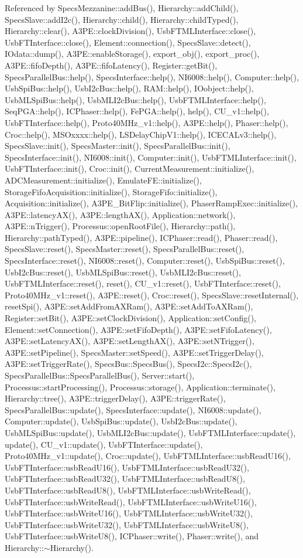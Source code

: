 Referenced by SpecsMezzanine::addBus(), Hierarchy::addChild(), SpecsSlave::addI2c(), Hierarchy::child(), Hierarchy::childTyped(), Hierarchy::clear(), A3PE::clockDivision(), UsbFTMLInterface::close(), UsbFTInterface::close(), Element::connection(), SpecsSlave::detect(), IOdata::dump(), A3PE::enableStorage(), export\_\-obj(), export\_\-proc(), A3PE::fifoDepth(), A3PE::fifoLatency(), Register::getBit(), SpecsParallelBus::help(), SpecsInterface::help(), NI6008::help(), Computer::help(), UsbSpiBus::help(), UsbI2cBus::help(), RAM::help(), IOobject::help(), UsbMLSpiBus::help(), UsbMLI2cBus::help(), UsbFTMLInterface::help(), SeqPGA::help(), ICPhaser::help(), FePGA::help(), help(), CU\_\-v1::help(), UsbFTInterface::help(), Proto40MHz\_\-v1::help(), A3PE::help(), Phaser::help(), Croc::help(), MSOxxxx::help(), LSDelayChipV1::help(), ICECALv3::help(), SpecsSlave::init(), SpecsMaster::init(), SpecsParallelBus::init(), SpecsInterface::init(), NI6008::init(), Computer::init(), UsbFTMLInterface::init(), UsbFTInterface::init(), Croc::init(), CurrentMeasurement::initialize(), ADCMeasurement::initialize(), EmulateFE::initialize(), StorageFifoAcquisition::initialize(), StorageFifo::initialize(), Acquisition::initialize(), A3PE\_\-BitFlip::initialize(), PhaserRampExec::initialize(), A3PE::latencyAX(), A3PE::lengthAX(), Application::network(), A3PE::nTrigger(), Processus::openRootFile(), Hierarchy::path(), Hierarchy::pathTyped(), A3PE::pipeline(), ICPhaser::read(), Phaser::read(), SpecsSlave::reset(), SpecsMaster::reset(), SpecsParallelBus::reset(), SpecsInterface::reset(), NI6008::reset(), Computer::reset(), UsbSpiBus::reset(), UsbI2cBus::reset(), UsbMLSpiBus::reset(), UsbMLI2cBus::reset(), UsbFTMLInterface::reset(), reset(), CU\_\-v1::reset(), UsbFTInterface::reset(), Proto40MHz\_\-v1::reset(), A3PE::reset(), Croc::reset(), SpecsSlave::resetInternal(), resetSpi(), A3PE::setAddFromAXRam(), A3PE::setAddToAXRam(), Register::setBit(), A3PE::setClockDivision(), Application::setConfig(), Element::setConnection(), A3PE::setFifoDepth(), A3PE::setFifoLatency(), A3PE::setLatencyAX(), A3PE::setLengthAX(), A3PE::setNTrigger(), A3PE::setPipeline(), SpecsMaster::setSpeed(), A3PE::setTriggerDelay(), A3PE::setTriggerRate(), SpecsBus::SpecsBus(), SpecsI2c::SpecsI2c(), SpecsParallelBus::SpecsParallelBus(), Server::start(), Processus::startProcessing(), Processus::storage(), Application::terminate(), Hierarchy::tree(), A3PE::triggerDelay(), A3PE::triggerRate(), SpecsParallelBus::update(), SpecsInterface::update(), NI6008::update(), Computer::update(), UsbSpiBus::update(), UsbI2cBus::update(), UsbMLSpiBus::update(), UsbMLI2cBus::update(), UsbFTMLInterface::update(), update(), CU\_\-v1::update(), UsbFTInterface::update(), Proto40MHz\_\-v1::update(), Croc::update(), UsbFTMLInterface::usbReadU16(), UsbFTInterface::usbReadU16(), UsbFTMLInterface::usbReadU32(), UsbFTInterface::usbReadU32(), UsbFTMLInterface::usbReadU8(), UsbFTInterface::usbReadU8(), UsbFTMLInterface::usbWriteRead(), UsbFTInterface::usbWriteRead(), UsbFTMLInterface::usbWriteU16(), UsbFTInterface::usbWriteU16(), UsbFTMLInterface::usbWriteU32(), UsbFTInterface::usbWriteU32(), UsbFTMLInterface::usbWriteU8(), UsbFTInterface::usbWriteU8(), ICPhaser::write(), Phaser::write(), and Hierarchy::$\sim$Hierarchy().


